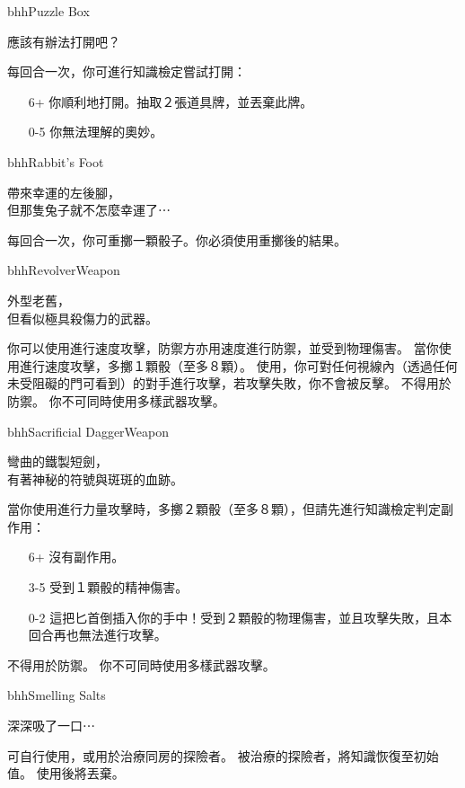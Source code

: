 \linebreak[0]%
\begin{ItemCard}{bhh}{Puzzle Box}{}
  \begin{CardStory}
    應該有辦法打開吧？
  \end{CardStory}
  每回合一次，你可進行知識檢定嘗試打開\ThisName{}：
  \begin{itemize}
    \item[6+] 你順利地打開\ThisName{}。抽取２張道具牌，並丟棄此牌。
    \item[0-5] 你無法理解\ThisName{}的奧妙。
  \end{itemize}
\end{ItemCard}%
\linebreak[0]%
\begin{ItemCard}{bhh}{Rabbit’s Foot}{}
  \begin{CardStory}
    帶來幸運的左後腳，\\
    但那隻兔子就不怎麼幸運了⋯
  \end{CardStory}
  每回合一次，你可重擲一顆骰子。你必須使用重擲後的結果。\smallbreak
\end{ItemCard}%
\linebreak[0]%
\begin{ItemCard}{bhh}{Revolver}{Weapon}
  \begin{CardStory}
    外型老舊，\\
    但看似極具殺傷力的武器。
  \end{CardStory}
  你可以使用\ThisName{}進行速度攻擊，防禦方亦用速度進行防禦，並受到物理傷害。\smallbreak
  當你使用\ThisName{}進行速度攻擊，多擲１顆骰（至多８顆）。\smallbreak
  使用\ThisName{}，你可對任何視線內（透過任何未受阻礙的門可看到）的對手進行攻擊，若攻擊失敗，你不會被反擊。\smallbreak
  \ThisName{}不得用於防禦。\smallbreak
  你不可同時使用多樣武器攻擊。\smallbreak
\end{ItemCard}%
\linebreak[0]%
\begin{ItemCard}{bhh}{Sacrificial Dagger}{Weapon}
  \begin{CardStory}
    彎曲的鐵製短劍，\\
    有著神秘的符號與斑斑的血跡。
  \end{CardStory}
  當你使用\ThisName{}進行力量攻擊時，多擲２顆骰（至多８顆），但請先進行知識檢定判定副作用：
  \begin{itemize}
    \item[6+] 沒有副作用。
    \item[3-5] 受到１顆骰的精神傷害。
    \item[0-2] 這把匕首倒插入你的手中！受到２顆骰的物理傷害，並且攻擊失敗，且本回合再也無法進行攻擊。
  \end{itemize}
  \ThisName{}不得用於防禦。\smallbreak
  你不可同時使用多樣武器攻擊。\smallbreak
\end{ItemCard}%
\linebreak[0]%
\begin{ItemCard}{bhh}{Smelling Salts}{}
  \begin{CardStory}
    深深吸了一口⋯
  \end{CardStory}
  可自行使用，或用於治療同房的探險者。\smallbreak
  被\ThisName{}治療的探險者，將知識恢復至初始值。\smallbreak
  使用後將\ThisName{}丟棄。\smallbreak
\end{ItemCard}%
\linebreak[0]%
